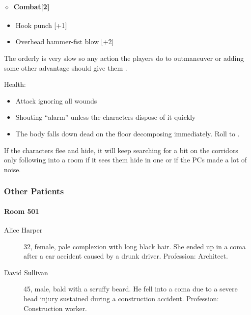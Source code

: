 \documentclass[bg-full]{resources/stylesheets/kult}
\begin{document}
\paragraph{\(\diamond\)~Combat[2]}%
\begin{itemize}[noitemsep]
  \item Hook punch [+1]
  \item Overhead hammer-fist blow [+2]
\end{itemize}
The orderly is very slow so any action the players do to outmaneuver or adding some other advantage should give them .

Health:   

\begin{itemize}[noitemsep]
  \item Attack ignoring all wounds
  \item Shouting “alarm” unless the characters dispose of it quickly
  \item[\KULTgold{\skull}] The body falls down dead on the floor decomposing immediately.  Roll to .
\end{itemize}

If the characters flee and hide, it will keep searching for a bit on the corridors only following into a room if it sees them
hide in one or if the PCs made a lot of noise.

\subsubsection{Other Patients}%
\label{ssub:other_patients}


\paragraph{Room 501}%
\begin{description}
  \item[Alice Harper] 32, female, pale complexion with long black hair. She ended up in a coma after a car accident caused by a drunk driver. Profession: Architect.
  \item[David Sullivan] 45, male, bald with a scruffy beard. He fell into a coma due to a severe head injury sustained during a construction accident. Profession: Construction worker.
\end{description}
\end{document}
